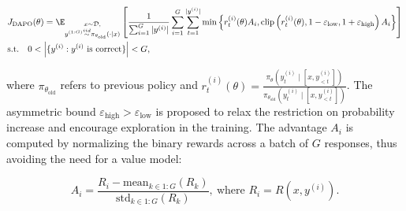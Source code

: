 \vspace{-15pt}
\begin{small}
\begin{align*}
&J_{\text{DAPO}}(\theta)=\E_{\substack{x \sim \mathcal{D},\\y^{(1:G)} \overset{iid}{\sim} \pi_{\theta_{\text{old}}}(\cdot\mid x)}} 
\left[\frac{1}{\sum_{i=1}^G |y^{(i)}|}
\sum_{i=1}^G\sum_{t=1}^{|y^{(i)}|}\min\left\{r^{(i)}_{t}(\theta)A_i,\mathrm{clip}\left(r^{(i)}_{t}(\theta),1-\varepsilon_{\text{low}},1+\varepsilon_{\text{high}}\right)A_i\right\}
\right]\\
&\mathrm{s.t.}\quad 0<\left|\{y^{(i)}:y^{(i)}\mathrm{~is~correct}\}\right|<G,
\end{align*}
\end{small}
\vspace{-15pt}

where $\pi_{\theta_{\text{old}}}$ refers to previous policy and $r^{(i)}_{t}(\theta)=\frac{\pi_{\theta}(y^{(i)}_{t} \mid [x, y^{(i)}_{<t}])}{\pi_{\theta_{\text{old}}}(y^{(i)}_{t} \mid [x, y^{(i)}_{<t}])}$.  The asymmetric bound $\varepsilon_{\text{high}} > \varepsilon_{\text{low}}$ is proposed to relax the restriction on probability increase and encourage exploration in the training. 
The advantage $A_i$ is computed by normalizing the binary rewards across a batch of $G$ responses, thus avoiding the need for a value model:

\begin{small}
\begin{equation*}
A_i=\frac{R_i-\mathrm{mean}_{k\in 1:G}(R_k)}{\mathrm{std}_{k\in 1:G}(R_k)},~
\text{where } R_i=R(x,y^{(i)}).
\end{equation*}
\end{small}

%

